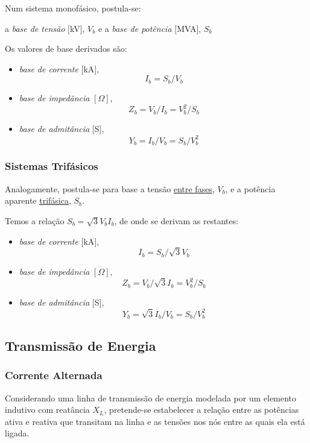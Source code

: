 \begin{mdframed}
    \noindent Num sistema monofásico, postula-se: 
    \begin{center}
        a \textit{base de tensão} $[$kV$]$, $V_b$ e a \textit{base de potência} $[$MVA$]$, $S_b$
    \end{center}
    \noindent Os valores de base derivados são:
    \begin{itemize}[noitemsep,label=-,font=\bfseries]
        \item \textit{base de corrente} $[$kA$]$, $$ I_b = S_b/V_b $$
        \item \textit{base de impedância} $[\Omega]$, $$ Z_b = V_b/I_b = V^2_b/S_b $$
        \item \textit{base de admitância} $[$S$]$, $$ Y_b = I_b/V_b = S_b/V^2_b$$
    \end{itemize}
\end{mdframed}

\subsubsection{Sistemas Trifásicos}

\begin{mdframed}
Analogamente, postula-se para base a tensão \underline{entre fases}, $V_b$, e a potência aparente \underline{trifásica}, $S_b$.

\vspace{1em}
\noindent Temos a relação $S_b = \sqrt{3} V_b I_b$, de onde se derivam as restantes:
\begin{itemize}[noitemsep,label=-,font=\bfseries]
        \item \textit{base de corrente} $[$kA$]$, $$ I_b = S_b/\sqrt{3}V_b $$
        \item \textit{base de impedância} $[\Omega]$, $$ Z_b = V_b/\sqrt{3}I_b = V^2_b/S_b $$
        \item \textit{base de admitância} $[$S$]$, $$ Y_b = \sqrt{3}I_b/V_b = S_b/V^2_b$$
    \end{itemize}
\end{mdframed}

\subsection{Transmissão de Energia}
\subsubsection{Corrente Alternada}
Considerando uma linha de transmissão de energia modelada por um elemento indutivo com reatância $X_L$, pretende-se estabelecer a relação entre as potências ativa e reativa que transitam na linha e as tensões nos nós entre as quais ela está ligada.

